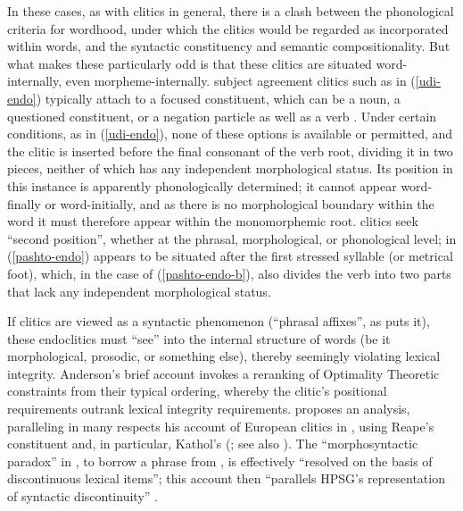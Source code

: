 \documentclass[output=paper
 	        ,biblatex
                ,babelshorthands
                ,newtxmath
                ,draftmode
                ,colorlinks, citecolor=brown
]{langscibook}
\begin{document}
In these cases, as with clitics in general, there is a clash between the phonological criteria for wordhood, under which the clitics would be regarded as incorporated within words, and the syntactic constituency and semantic compositionality.
But what makes these particularly odd is that these clitics are situated word-internally, even morpheme-internally.
 subject agreement clitics such as  in (\ref{udi-endo}) typically attach to a focused constituent, which can be a noun, a questioned constituent, or a negation particle as well as a verb \citep{Harris2000}.
Under certain conditions, as in (\ref{udi-endo}), none of these options is available or permitted, and the clitic is inserted before the final consonant of the verb root, dividing it in two pieces, neither of which has any independent morphological status.
Its position in this instance is apparently phonologically determined; it cannot appear word-finally or word-initially, and as there is no morphological boundary within the word it must therefore appear within the monomorphemic root.
 clitics seek ``second position'', whether at the phrasal, morphological, or phonological level;  in (\ref{pashto-endo}) appears to be situated after the first stressed syllable (or metrical foot), which, in the case of (\ref{pashto-endo-b}), also divides the verb into two parts that lack any independent morphological status.

If clitics are viewed as a syntactic phenomenon (``phrasal affixes'', as \citealt{Anderson2005} puts
it), these endoclitics must ``see'' into the internal structure of words (be it morphological,
prosodic, or something else), thereby seemingly violating lexical
integrity. Anderson's brief account invokes a reranking of Optimality Theoretic constraints from
their typical ordering, whereby the clitic's positional requirements outrank lexical integrity
requirements. \citet{Crysmann2000b} proposes an analysis, paralleling in many respects his account
of European  clitics in \citet{Crysmann2000a}, using Reape's constituent  \citep{Reape1994} and, in particular, Kathol's 
(\citealt{Kathol2000a}; see also ). The ``morphosyntactic paradox'' in , to borrow
a phrase from \citet[]{Crysmann2003d}, is effectively ``resolved on the basis of discontinuous lexical items''; this account then ``parallels HPSG's representation of syntactic discontinuity'' \citep{Crysmann2000b}.
\end{document}

